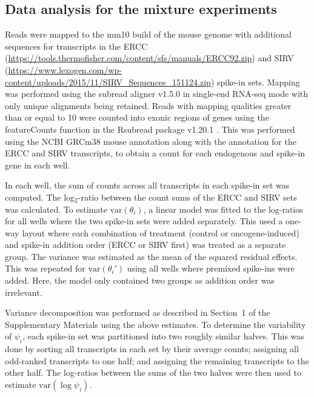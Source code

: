 \documentclass{article}
\begin{document}
\subsection{Data analysis for the mixture experiments}
Reads were mapped to the mm10 build of the mouse genome with additional sequences for transcripts in the ERCC (\url{https://tools.thermofisher.com/content/sfs/manuals/ERCC92.zip}) and SIRV (\url{https://www.lexogen.com/wp-content/uploads/2015/11/SIRV_Sequences_151124.zip}) spike-in sets.
Mapping was performed using the subread aligner v1.5.0 \cite{liao2013subread} in single-end RNA-seq mode with only unique alignments being retained.
Reads with mapping qualities greater than or equal to 10 were counted into exonic regions of genes using the featureCounts function in the Rsubread package v1.20.1 \cite{liao2014featurecounts}.
This was performed using the NCBI GRCm38 mouse annotation along with the annotation for the ERCC and SIRV transcripts, to obtain a count for each endogenous and spike-in gene in each well.

In each well, the sum of counts across all transcripts in each spike-in set was computed.
The log$_2$-ratio between the count sums of the ERCC and SIRV sets was calculated.
To estimate $\mbox{var}(\theta_i)$, a linear model was fitted to the log-ratios for all wells where the two spike-in sets were added separately.
This used a one-way layout where each combination of treatment (control or oncogene-induced) and spike-in addition order (ERCC or SIRV first) was treated as a separate group.
The variance was estimated as the mean of the squared residual effects.
This was repeated for $\mbox{var}(\theta_i')$ using all wells where premixed spike-ins were added.
Here, the model only contained two groups as addition order was irrelevant.

Variance decomposition was performed as described in Section~1 of the Supplementary Materials using the above estimates.
To determine the variability of $\psi_i$, each spike-in set was partitioned into two roughly similar halves.
This was done by sorting all transcripts in each set by their average counts; assigning all odd-ranked transcripts to one half; and assigning the remaining transcripts to the other half.
The log-ratios between the sums of the two halves were then used to estimate $\mbox{var}(\log \psi_i)$.
\end{document}
